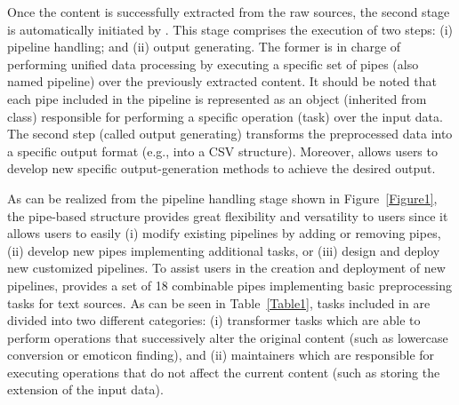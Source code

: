Once the content is successfully extracted from the raw sources, the second stage is automatically initiated by . This stage comprises the execution of two steps: (i) pipeline handling; and (ii) output generating. The former is in charge of performing unified data processing by executing a specific set of pipes (also named pipeline) over the previously extracted content. It should be noted that each pipe included in the pipeline is represented as an object (inherited from  class) responsible for performing a specific operation (task) over the input data. The second step (called output generating) transforms the preprocessed data into a specific output format (e.g., into a CSV structure). Moreover,  allows users to develop new specific output-generation methods to achieve the desired output.

As can be realized from the pipeline handling stage shown in Figure~\ref{Figure1}, the pipe-based structure provides great flexibility and versatility to users since it allows users to easily (i) modify existing pipelines by adding or removing pipes, (ii) develop new pipes implementing additional tasks, or (iii) design and deploy new customized pipelines. To assist users in the creation and deployment of new pipelines,  provides a set of 18 combinable pipes implementing basic preprocessing tasks for text sources. As can be seen in Table~\ref{Table1}, tasks included in  are divided into two different categories: (i) transformer tasks which are able to perform operations that successively alter the original content (such as lowercase conversion or emoticon finding), and (ii) maintainers which are responsible for executing operations that do not affect the current content (such as storing the extension of the input data). 

